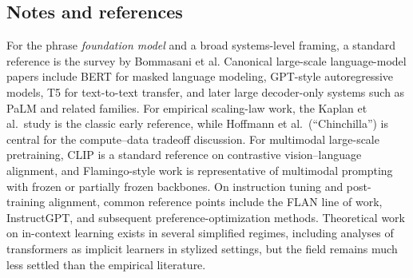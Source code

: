 \subsection*{Notes and references}

For the phrase \emph{foundation model} and a broad systems-level framing, a standard reference is the survey by Bommasani et al.
Canonical large-scale language-model papers include BERT for masked language modeling, GPT-style autoregressive models, T5 for text-to-text transfer, and later large decoder-only systems such as PaLM and related families.
For empirical scaling-law work, the Kaplan et al.~study is the classic early reference, while Hoffmann et al.~(``Chinchilla'') is central for the compute--data tradeoff discussion.
For multimodal large-scale pretraining, CLIP is a standard reference on contrastive vision--language alignment, and Flamingo-style work is representative of multimodal prompting with frozen or partially frozen backbones.
On instruction tuning and post-training alignment, common reference points include the FLAN line of work, InstructGPT, and subsequent preference-optimization methods.
Theoretical work on in-context learning exists in several simplified regimes, including analyses of transformers as implicit learners in stylized settings, but the field remains much less settled than the empirical literature.
